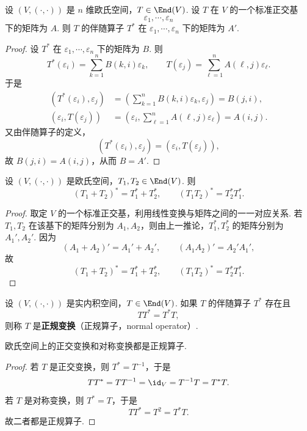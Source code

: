 \begin{corollary}
	设 $(V,(\cdot,\cdot))$ 是 $n$ 维欧氏空间，$T\in\End(V)$. 设 $T$ 在 $V$ 的一个标准正交基
	\[
	\varepsilon_1,\cdots,\varepsilon_n
	\]
	下的矩阵为 $A$. 则 $T$ 的伴随算子 $T^*$ 在 $\varepsilon_1,\cdots,\varepsilon_n$ 下的矩阵为 $A'$.
\end{corollary}
\begin{proof}
	设 $T^*$ 在 $\varepsilon_1,\cdots,\varepsilon_n$ 下的矩阵为 $B$. 则
	\[
	T^*(\varepsilon_i)=\sum_{k=1}^{n}B(k,i)\varepsilon_k,
	\qquad
	T(\varepsilon_j)=\sum_{\ell=1}^{n}A(\ell,j)\varepsilon_\ell.
	\]
	于是
	\[
	\begin{aligned}
		(T^*(\varepsilon_i),\varepsilon_j)
		&=\left(\sum_{k=1}^{n}B(k,i)\varepsilon_k,\varepsilon_j\right)=B(j,i),\\
		(\varepsilon_i,T(\varepsilon_j))
		&=\left(\varepsilon_i,\sum_{\ell=1}^{n}A(\ell,j)\varepsilon_\ell\right)=A(i,j).
	\end{aligned}
	\]
	又由伴随算子的定义，
	\[
	(T^*(\varepsilon_i),\varepsilon_j)=(\varepsilon_i,T(\varepsilon_j)),
	\]
	故 $B(j,i)=A(i,j)$，从而 $B=A'$.
\end{proof}

\begin{corollary}
	设 $(V,(\cdot,\cdot))$ 是欧氏空间，$T_1,T_2\in\End(V)$. 则
	\[
	(T_1+T_2)^*=T_1^*+T_2^*,
	\qquad
	(T_1T_2)^*=T_2^*T_1^*.
	\]
\end{corollary}
\begin{proof}
	取定 $V$ 的一个标准正交基，利用线性变换与矩阵之间的一一对应关系. 若 $T_1,T_2$ 在该基下的矩阵分别为 $A_1,A_2$，则由上一推论，$T_1^*,T_2^*$ 的矩阵分别为 $A_1',A_2'$. 因为
	\[
	(A_1+A_2)'=A_1'+A_2',
	\qquad
	(A_1A_2)'=A_2'A_1',
	\]
	故
	\[
	(T_1+T_2)^*=T_1^*+T_2^*,
	\qquad
	(T_1T_2)^*=T_2^*T_1^*.
	\]
\end{proof}

\begin{definition}\label{p1:concept:c6-l2272}
	设 $(V,(\cdot,\cdot))$ 是实内积空间，$T\in\End(V)$. 如果 $T$ 的伴随算子 $T^*$ 存在且
	\[
	TT^*=T^*T,
	\]
	则称 $T$ 是\textbf{正规变换}（正规算子，normal operator）.
\end{definition}

\begin{example}
	欧氏空间上的正交变换和对称变换都是正规算子.
\end{example}
\begin{proof}
	若 $T$ 是正交变换，则 $T^*=T^{-1}$，于是
	\[
	TT^*=TT^{-1}=\id_V=T^{-1}T=T^*T.
	\]
	若 $T$ 是对称变换，则 $T^*=T$，于是
	\[
	TT^*=T^2=T^*T.
	\]
	故二者都是正规算子.
\end{proof}

